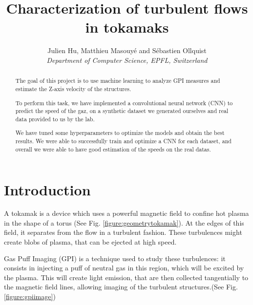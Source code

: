 \documentclass[10pt,conference]{IEEEtran}
\begin{document}
\title{Characterization of turbulent flows in tokamaks}

\author{
  Julien Hu, Matthieu Masouyé and Sébastien Ollquist\\
  \textit{Department of Computer Science, EPFL, Switzerland}
}

\maketitle
\thispagestyle{plain}
\pagestyle{plain}

\begin{abstract}
    The goal of this project is to use machine learning to analyze GPI measures and estimate the Z-axis velocity of the structures.\par 
    To perform this task, we have implemented a convolutional neural network (CNN) to predict the speed of the gaz, on a synthetic dataset we generated ourselves and real data provided to us by the lab.\par
    We have tuned some hyperparameters to optimize the models and obtain the best results. We were able to successfully train and optimize a CNN for each dataset, and overall we were able to have good estimation of the speeds on the real datas. 
\end{abstract}

\section{Introduction}
A tokamak is a device which uses a powerful magnetic field to confine hot plasma in the shape of a torus\cite{wikipediatokamak} (See Fig. \ref{figure:geometrytokamak}). At the edges of this field, it separates from the flow in a turbulent fashion. These turbulences might create blobs of plasma, that can be ejected at high speed.\par 
Gas Puff Imaging (GPI) is a technique used to study these turbulences: it consists in injecting a puff of neutral gas in this region, which will be excited by the plasma. This will create light emission, that are then collected tangentially to the magnetic field lines, allowing imaging of the turbulent structures.(See Fig. \ref{figure:gpiimage})\par
\end{document}
